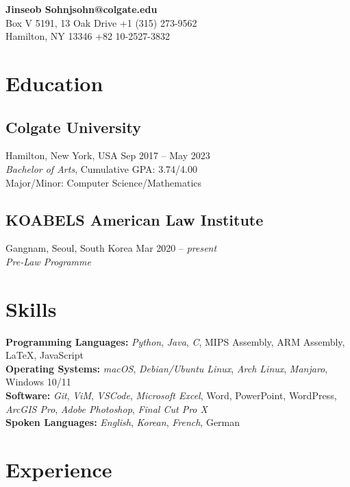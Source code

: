 \documentclass[11pt, letterpaper]{article}
\begin{document}
\begin{multicols}{2}
\begin{flushleft}
    \textbf{\Large Jinseob Sohn}\hfill \textbf{jsohn@colgate.edu} \\
        Box V 5191, 13 Oak Drive \hfill +1 (315) 273-9562 \\
        Hamilton, NY 13346 \hfill +82 10-2527-3832 \\
\end{flushleft}

    
\section{Education}
\subsection{Colgate University} 
\noindent Hamilton, New York, USA \hfill Sep 2017 – May 2023\\
\textit{Bachelor of Arts}, Cumulative GPA: 3.74/4.00\\
Major/Minor: Computer Science/Mathematics
\subsection{KOABELS American Law Institute} 
\noindent Gangnam, Seoul, South Korea \hfill Mar 2020 – \textit{present} \\
\textit{Pre-Law Programme}

\section{Skills}
\noindent \textbf{Programming Languages:} \emph{Python}, \emph{Java}, \emph{C}, MIPS Assembly, ARM Assembly, \LaTeX, JavaScript\\
\noindent \textbf{Operating Systems:} \emph{macOS}, \emph{Debian/Ubuntu Linux}, \emph{Arch Linux}, \emph{Manjaro}, Windows 10/11\\
\textbf{Software: } \emph{Git}, \emph{ViM}, \emph{VSCode}, \emph{Microsoft Excel}, Word, PowerPoint,  WordPress, \emph{ArcGIS Pro}, \emph{Adobe Photoshop}, \emph{Final Cut Pro X}\\
\textbf{Spoken Languages:} \emph{English}, \emph{Korean}, \emph{French}, German
\section{Experience}

\end{multicols}
\end{document}
